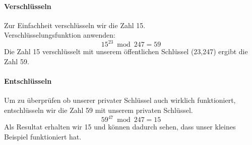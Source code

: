 \paragraph{Verschlüsseln}
Zur Einfachheit verschlüsseln wir die Zahl 15.\\
Verschlüsselungsfunktion anwenden:
\begin{equation*}
  15^{23} \bmod 247 = 59
\end{equation*}
Die Zahl 15 verschlüsselt mit unserem öffentlichen Schlüssel (23,247) ergibt die Zahl 59.
%
\paragraph{Entschlüsseln}
Um zu überprüfen ob unserer privater Schlüssel auch wirklich funktioniert, entschlüsseln wir die Zahl 59 mit unserem privaten Schlüssel.\\
\begin{equation*}
  59^{47} \bmod 247 = 15
\end{equation*}
Als Resultat erhalten wir 15 und können dadurch sehen, dass unser kleines Beispiel funktioniert hat.
%
%
